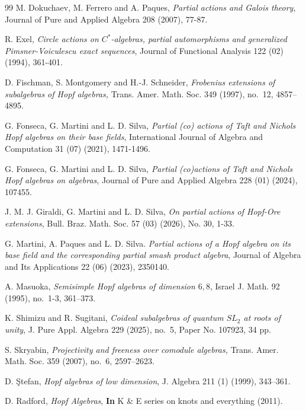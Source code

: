 \documentclass[reqno]{amsart}
\theoremstyle{definition}
\numberwithin{equation}{section}\theoremstyle{plain}
\theoremstyle{definition}
\begin{document}
\begin{thebibliography}{99}
	 M. Dokuchaev, M. Ferrero and A. Paques, \emph{Partial actions and Galois theory}, Journal of Pure and Applied Algebra 208 (2007), 77-87.

	 R. Exel, \emph{Circle actions on $C^\ast$-algebras, partial automorphisms and generalized Pimsner-Voiculescu exact sequences}, Journal of Functional Analysis 122 (02) (1994), 361-401.

  D. Fischman, S. Montgomery and H.-J. Schneider, \emph{Frobenius extensions of subalgebras of Hopf algebras,} Trans. Amer. Math. Soc. {349} (1997), no.~12, 4857--4895.

 G. Fonseca, G. Martini and L. D. Silva, \emph{Partial (co) actions of {T}aft and {N}ichols {H}opf algebras on their base fields}, International Journal of Algebra and Computation 31 (07) (2021), 1471-1496.

 G. Fonseca, G. Martini and L. D. Silva, \emph{Partial (co)actions of {T}aft and {N}ichols {H}opf algebras on algebras}, Journal of Pure and Applied Algebra 228 (01) (2024), 107455.

 J. M. J. Giraldi, G. Martini and L. D. Silva, \emph{On partial actions of Hopf-Ore extensions}, Bull. Braz. Math. Soc. 57 (03) (2026), No. 30, 1-33.

 G. Martini, A. Paques and L. D. Silva. \emph{Partial actions of a Hopf algebra on its base field and the corresponding partial smash product algebra}, Journal of Algebra and Its Applications 22 (06) (2023), 2350140.

 A. Masuoka, \emph{Semisimple Hopf algebras of dimension $6,8$}, Israel J. Math. 92 (1995), no.~1-3, 361--373.

 K. Shimizu and R. Sugitani, \emph{Coideal subalgebras of quantum $SL_{2}$ at roots of unity}, J. Pure Appl. Algebra 229 (2025), no.~5, Paper No. 107923, 34 pp.

 S. Skryabin, \emph{Projectivity and freeness over comodule algebras,} Trans. Amer. Math. Soc. 359 (2007), no.~6, 2597--2623. 

 D. \c Stefan, \emph{Hopf algebras of low dimension}, J. Algebra  211 (1) (1999), 343--361.

 D. Radford, \emph{Hopf Algebras}, \textbf{In} K \& E series on knots and everything (2011).
    
	\end{thebibliography}
\end{document}
